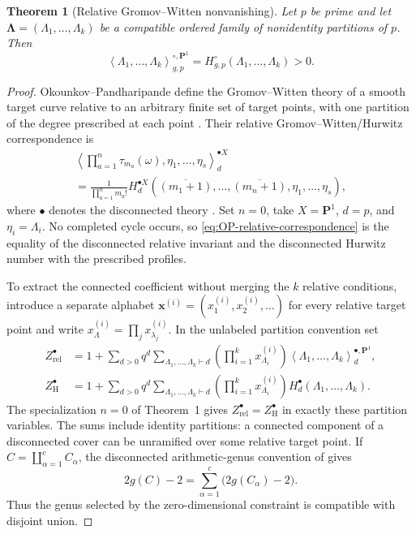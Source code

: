 \documentclass[11pt]{amsart}
\theoremstyle{plain}
\newtheorem{theorem}{Theorem}[section]
\theoremstyle{definition}
\numberwithin{equation}{section}
\begin{document}
\begin{theorem}[Relative Gromov--Witten nonvanishing]
\label{thm:relative-GW-nonvanishing}
Let $p$ be prime and let
$\boldsymbol\Lambda=(\Lambda_1,\ldots,\Lambda_k)$ be a compatible ordered
family of nonidentity partitions of $p$.  Then
\begin{equation}\label{eq:relative-GW-equals-Hurwitz}
 \left\langle\Lambda_1,\ldots,\Lambda_k
 \right\rangle^{\circ,\mathbf P^1}_{g,p}
 =H^\circ_{g,p}(\Lambda_1,\ldots,\Lambda_k)>0.
\end{equation}
\end{theorem}

\begin{proof}
Okounkov--Pandharipande define the Gromov--Witten theory of a smooth target
curve relative to an arbitrary finite set of target points, with one
partition of the degree prescribed at each point
\cite[Section~1.2]{OkounkovPandharipande}.  Their relative
Gromov--Witten/Hurwitz correspondence is
\begin{multline}\label{eq:OP-relative-correspondence}
 \left\langle
   \prod_{a=1}^{n}\tau_{m_a}(\omega),
   \eta_1,\ldots,\eta_s
 \right\rangle^{\bullet X}_{d}\\
 =\frac1{\prod_{a=1}^{n}m_a!}
 H^{\bullet X}_{d}
 \left(\overline{(m_1+1)},\ldots,\overline{(m_n+1)},
       \eta_1,\ldots,\eta_s\right),
\end{multline}
where $\bullet$ denotes the disconnected theory
\cite[Theorem~1]{OkounkovPandharipande}.  Set $n=0$, take
$X=\mathbf P^1$, $d=p$, and $\eta_i=\Lambda_i$.  No completed cycle occurs,
so \eqref{eq:OP-relative-correspondence} is the equality of the
disconnected relative invariant and the disconnected Hurwitz number with
the prescribed profiles.

To extract the connected coefficient without merging the $k$ relative
conditions, introduce a separate alphabet
$\mathbf x^{(i)}=(x^{(i)}_1,x^{(i)}_2,\ldots)$ for every relative target
point and write $x^{(i)}_\Lambda=\prod_jx^{(i)}_{\lambda_j}$.  In the
unlabeled partition convention set
\begin{align*}
 Z^\bullet_{\mathrm{rel}}
 &=1+\sum_{d>0}q^d
   \sum_{\Lambda_1,\ldots,\Lambda_k\vdash d}
   \left(\prod_{i=1}^k x^{(i)}_{\Lambda_i}\right)
   \left\langle\Lambda_1,\ldots,\Lambda_k
   \right\rangle^{\bullet,\mathbf P^1}_{d},\\
 Z^\bullet_{\mathrm H}
 &=1+\sum_{d>0}q^d
   \sum_{\Lambda_1,\ldots,\Lambda_k\vdash d}
   \left(\prod_{i=1}^k x^{(i)}_{\Lambda_i}\right)
   H^\bullet_d(\Lambda_1,\ldots,\Lambda_k).
\end{align*}
The specialization $n=0$ of Theorem~1 gives
$Z^\bullet_{\mathrm{rel}}=Z^\bullet_{\mathrm H}$ in exactly these
partition variables.  The sums include identity partitions: a connected
component of a disconnected cover can be unramified over some relative
target point.  If $C=\coprod_{\alpha=1}^cC_\alpha$, the disconnected
arithmetic-genus convention of
\cite[Section~0.2]{OkounkovPandharipande} gives
\[
 2g(C)-2=\sum_{\alpha=1}^c\bigl(2g(C_\alpha)-2\bigr).
\]
Thus the genus selected by the zero-dimensional constraint is compatible
with disjoint union.


\end{proof}
\end{document}
